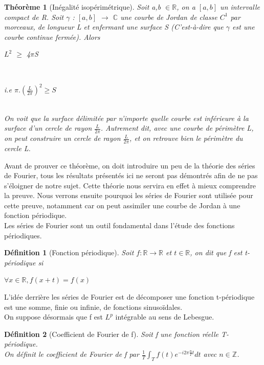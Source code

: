 \documentclass{book}
\newtheorem{theorem}{Théorème}
\newtheorem{definition}{Définition}
\begin{document}
\begin{tcolorbox}[colback=green!6]
\begin{theorem}[Inégalité isopérimétrique]
Soit a,b $\in \mathbb{R}$, on a $[a,b]$ un intervalle compact de R. Soit $\gamma$ : $[a,b]$ $\rightarrow$ $\mathbb{C}$ une courbe de Jordan de classe $C^1$ par morceaux, de longueur L et enfermant une surface S (C'est-à-dire que $\gamma$ est une courbe continue fermée). Alors\\
\centerline{$L^2$ $\geq$ 4$\pi$S}\\
\centerline{i.e $\pi .(\frac{L}{2\pi})^2 \geq S$}\\
On voit que la surface délimitée par n'importe quelle courbe est inférieure à la surface d'un cercle de rayon $\frac{L}{2\pi}$. Autrement dit, avec une courbe de périmètre L, on peut construire un cercle de rayon $\frac{L}{2\pi}$, et on retrouve bien le périmètre du cercle L.
\end{theorem}
\end{tcolorbox}

{\noindent Avant de prouver ce théorème, on doit introduire un peu de la théorie des séries de Fourier, tous les résultats présentés ici ne seront pas démontrés afin de ne pas s'éloigner de notre sujet. Cette théorie nous servira en effet à mieux comprendre la preuve. Nous verrons ensuite pourquoi les séries de Fourier sont utilisée pour cette preuve, notamment car on peut assimiler une courbe de Jordan à une fonction périodique.}\\
Les séries de Fourier sont un outil fondamental dans l'étude des fonctions périodiques.

\begin{definition}[Fonction périodique]
Soit $f : \mathbb{R} \rightarrow \mathbb{R}$ et $t \in \mathbb{R}$, on dit que f est t-périodique si 
\centerline{$\forall x \in \mathbb{R}, f(x+t) = f(x)$}
\end{definition}

{\noindent L'idée derrière les séries de Fourier est de décomposer une fonction t-périodique est une somme, finie ou infinie, de fonctions sinusoïdales.}\\
On suppose désormais que f est $L^p$ intégrable au sens de Lebesgue.
\begin{definition}[Coefficient de Fourier de f]
Soit f une fonction réelle T-périodique.\\
On définit le coefficient de Fourier de f par $ \frac{1}{T} \int _T f(t) e^{-i2 \pi \frac{n}{T}t} dt$ avec $n \in \mathbb{Z}$.
\end{definition}
\end{document}
